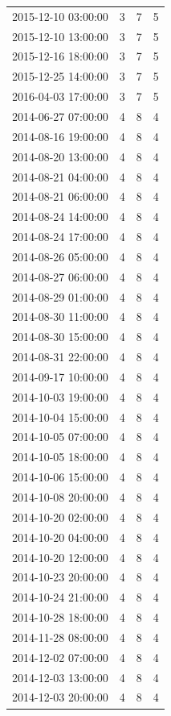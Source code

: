 \begin{tabular}{lrrr}
2015-12-10 03:00:00 & 3 & 7 & 5 \\
2015-12-10 13:00:00 & 3 & 7 & 5 \\
2015-12-16 18:00:00 & 3 & 7 & 5 \\
2015-12-25 14:00:00 & 3 & 7 & 5 \\
2016-04-03 17:00:00 & 3 & 7 & 5 \\
2014-06-27 07:00:00 & 4 & 8 & 4 \\
2014-08-16 19:00:00 & 4 & 8 & 4 \\
2014-08-20 13:00:00 & 4 & 8 & 4 \\
2014-08-21 04:00:00 & 4 & 8 & 4 \\
2014-08-21 06:00:00 & 4 & 8 & 4 \\
2014-08-24 14:00:00 & 4 & 8 & 4 \\
2014-08-24 17:00:00 & 4 & 8 & 4 \\
2014-08-26 05:00:00 & 4 & 8 & 4 \\
2014-08-27 06:00:00 & 4 & 8 & 4 \\
2014-08-29 01:00:00 & 4 & 8 & 4 \\
2014-08-30 11:00:00 & 4 & 8 & 4 \\
2014-08-30 15:00:00 & 4 & 8 & 4 \\
2014-08-31 22:00:00 & 4 & 8 & 4 \\
2014-09-17 10:00:00 & 4 & 8 & 4 \\
2014-10-03 19:00:00 & 4 & 8 & 4 \\
2014-10-04 15:00:00 & 4 & 8 & 4 \\
2014-10-05 07:00:00 & 4 & 8 & 4 \\
2014-10-05 18:00:00 & 4 & 8 & 4 \\
2014-10-06 15:00:00 & 4 & 8 & 4 \\
2014-10-08 20:00:00 & 4 & 8 & 4 \\
2014-10-20 02:00:00 & 4 & 8 & 4 \\
2014-10-20 04:00:00 & 4 & 8 & 4 \\
2014-10-20 12:00:00 & 4 & 8 & 4 \\
2014-10-23 20:00:00 & 4 & 8 & 4 \\
2014-10-24 21:00:00 & 4 & 8 & 4 \\
2014-10-28 18:00:00 & 4 & 8 & 4 \\
2014-11-28 08:00:00 & 4 & 8 & 4 \\
2014-12-02 07:00:00 & 4 & 8 & 4 \\
2014-12-03 13:00:00 & 4 & 8 & 4 \\
2014-12-03 20:00:00 & 4 & 8 & 4 \\

\end{tabular}
